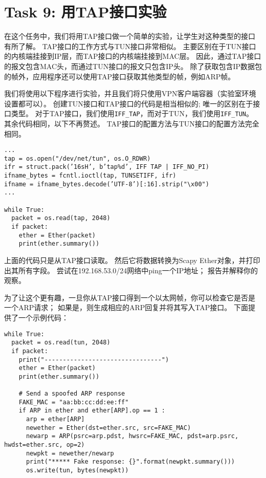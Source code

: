 \section{Task 9: 用TAP接口实验} 

在这个任务中，我们将用TAP接口做一个简单的实验，让学生对这种类型的接口有所了解。 
TAP接口的工作方式与TUN接口非常相似。
主要区别在于TUN接口的内核端挂接到IP层，而TAP接口的内核端挂接到MAC层。
因此，通过TAP接口的报文包含MAC头，而通过TUN接口的报文只包含IP头。
除了获取包含IP数据包的帧外，应用程序还可以使用TAP接口获取其他类型的帧，例如ARP帧。

我们将使用以下程序进行实验，并且我们将只使用VPN客户端容器（实验室环境设置都可以）。
创建TUN接口和TAP接口的代码是相当相似的;
唯一的区别在于接口类型。
对于TAP接口，我们使用\verb|IFF_TAP|，而对于TUN，我们使用\verb|IFF_TUN|。
其余代码相同，以下不再赘述。 
TAP接口的配置方法与TUN接口的配置方法完全相同。

\begin{lstlisting}
...
tap = os.open("/dev/net/tun", os.O_RDWR)
ifr = struct.pack(’16sH’, b’tap%d’, IFF TAP | IFF_NO_PI)
ifname_bytes = fcntl.ioctl(tap, TUNSETIFF, ifr)
ifname = ifname_bytes.decode(’UTF-8’)[:16].strip("\x00")
...

while True:
  packet = os.read(tap, 2048)
  if packet:
    ether = Ether(packet)
    print(ether.summary())
\end{lstlisting}

上面的代码只是从TAP接口读取。 
然后它将数据转换为Scapy Ether对象，并打印出其所有字段。 
尝试在192.168.53.0/24网络中ping一个IP地址； 
报告并解释你的观察。

为了让这个更有趣，一旦你从TAP接口得到一个以太网帧，你可以检查它是否是一个ARP请求； 
如果是，则生成相应的ARP回复并将其写入TAP接口。
下面提供了一个示例代码：

\begin{lstlisting}
while True:
  packet = os.read(tun, 2048)
  if packet:
    print("--------------------------------")
    ether = Ether(packet)
    print(ether.summary())

    # Send a spoofed ARP response
    FAKE_MAC = "aa:bb:cc:dd:ee:ff"
    if ARP in ether and ether[ARP].op == 1 :
      arp = ether[ARP]
      newether = Ether(dst=ether.src, src=FAKE_MAC)
      newarp = ARP(psrc=arp.pdst, hwsrc=FAKE_MAC, pdst=arp.psrc, hwdst=ether.src, op=2)
      newpkt = newether/newarp
      print("***** Fake response: {}".format(newpkt.summary()))
      os.write(tun, bytes(newpkt))
\end{lstlisting}

